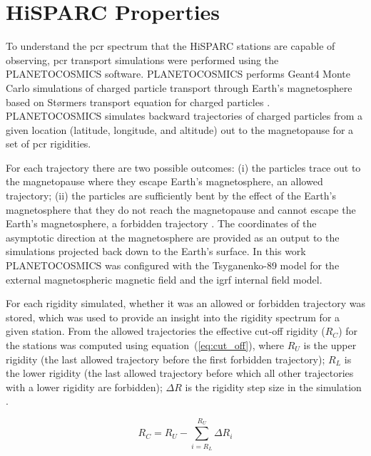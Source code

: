 \section{HiSPARC Properties}\label{sec:HS_properties}

To understand the \gls{pcr} spectrum that the HiSPARC stations are capable of observing, \gls{pcr} transport simulations were performed using the PLANETOCOSMICS software. PLANETOCOSMICS performs Geant4 Monte Carlo simulations of charged particle transport through Earth's magnetosphere based on St\o rmers transport equation for charged particles \citep{desorgher_planetocosmics_2006}. PLANETOCOSMICS simulates backward trajectories of charged particles from a given location (latitude, longitude, and altitude) out to the magnetopause for a set of \gls{pcr} rigidities. 

For each trajectory there are two possible outcomes: (i) the particles trace out to the magnetopause where they escape Earth's magnetosphere, an allowed trajectory; (ii) the particles are sufficiently bent by the effect of the Earth's magnetosphere that they do not reach the magnetopause and cannot escape the Earth's magnetosphere, a forbidden trajectory \citep{desorgher_planetocosmics_2006}. The coordinates of the asymptotic direction at the magnetosphere are provided as an output to the simulations projected back down to the Earth's surface. In this work PLANETOCOSMICS was configured with the Tsyganenko-89 model for the external magnetospheric magnetic field and the \gls{igrf} internal field model.

For each rigidity simulated, whether it was an allowed or forbidden trajectory was stored, which was used to provide an insight into the rigidity spectrum for a given station. From the allowed trajectories the effective cut-off rigidity ($R_C$) for the stations was computed using equation~(\ref{eq:cut_off}), where $R_U$ is the upper rigidity (the last allowed trajectory before the first forbidden trajectory); $R_L$ is the lower rigidity (the last allowed trajectory before which all other trajectories with a lower rigidity are forbidden); $\Delta R$ is the rigidity step size in the simulation \citep{desorgher_planetocosmics_2006, herbst_influence_2013}.

\begin{equation}
\label{eq:cut_off}
R_C = R_U - \sum_{i = R_L}^{R_U} \Delta R_i
\end{equation}

